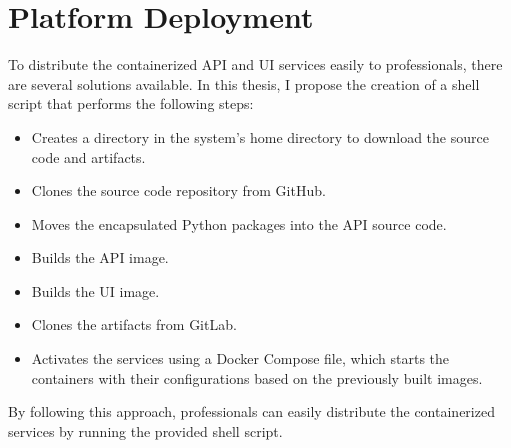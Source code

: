 \section{Platform Deployment}

To distribute the containerized API and UI services easily to professionals, there are several solutions available. In this thesis, I propose the creation of a shell script that performs the following steps:

\begin{itemize}
  \item Creates a directory in the system's home directory to download the source code and artifacts.
  \item Clones the source code repository from GitHub.
  \item Moves the encapsulated Python packages into the API source code.
  \item Builds the API image.
  \item Builds the UI image.
  \item Clones the artifacts from GitLab.
  \item Activates the services using a Docker Compose file, which starts the containers with their configurations based on the previously built images.
\end{itemize}

By following this approach, professionals can easily distribute the containerized services by running the provided shell script.

